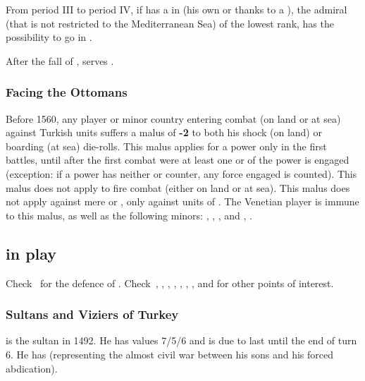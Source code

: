 From period III to period IV, if \TUR has a \TP in 
(his own or thanks to a \dipAT), the admiral (that is not restricted
to the Mediterranean Sea) of the lowest rank, has the possibility to
go in .

 After the fall of \paysMamelouks,
 serves \TUR.

\subsubsection{Facing the Ottomans}
\aparag Before 1560, any player or minor country entering combat (on
land or at sea) against Turkish units suffers a malus of {\bf -2} to
both his shock (on land) or boarding (at sea) die-rolls.
\aparag This malus applies for a power only in the first battles, until
after the first combat were at least one \ARMY or \FLEET of the power is
engaged (exception: if a power has neither \ARMY or \FLEET counter, any
force engaged is counted).  This malus does not apply to fire combat
(either on land or at sea). This malus does not apply against mere
\VASSAL or \TUR, only against units of \TUR.
\aparag
The Venetian player is immune to this malus, as well as the following
minors: , , ,  and
, .

\subsection{ in play}

Check~ for the defence of
. Check~,
, ,
, ,
, ,
 and 
for other points of interest.

\subsubsection{Sultans and Viziers of Turkey}
 is the sultan in 1492. He has
values 7/5/6 and is due to last until the end of turn 6.
 He has 
(representing the almost civil war between his sons and his forced
abdication).

